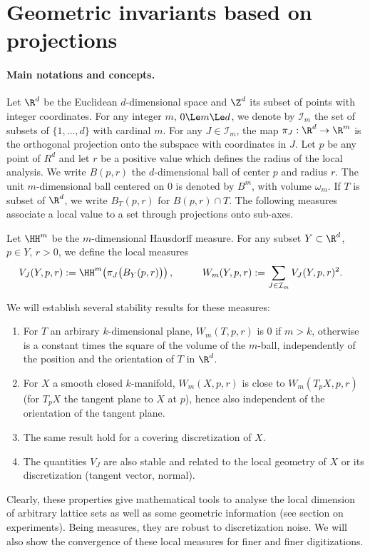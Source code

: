 \section{Geometric invariants based on projections}


\paragraph*{Main notations and concepts.}
Let $\R^d$ be the Euclidean $d$-dimensional space and $\Z^d$ its
subset of points with integer coordinates. For any integer $m$, $0 \Le
m \Le d$, we denote by $\mathcal{I}_m$ the set of subsets of
$\{1,\dots,d\}$ with cardinal $m$. For any $J \in \mathcal{I}_m$, the
map $\pi_J: \R^d \to \R^m$ is the orthogonal projection onto the
subspace with coordinates in $J$. Let $p$ be any point of $R^d$ and
let $r$ be a positive value which defines the radius of the local
analysis. We write $B(p,r)$ the $d$-dimensional ball of center $p$ and
radius $r$. The unit $m$-dimensional ball centered on $0$ is denoted
by $B^m$, with volume $\omega_m$. If $T$ is subset of $\R^d$, we write
$B_T(p,r)$ for $B(p,r) \cap T$. The following measures associate a
local value to a set through projections onto sub-axes.

\begin{definition}
  \label{def-local-measures}
  Let $\HH^m$ be the $m$-dimensional
  Hausdorff measure. For any subset $Y \subset \R^d$, $p \in Y$, $r>0$, we define the local measures
  \begin{align}
    V_J(Y,p,r) &:= \HH^m\!\left( \pi_J\bigl(B_Y(p,r)\bigr) \right),
    \quad
    && & W_m(Y,p,r) & := \sum_{J \in \mathcal{I}_m} V_J(Y,p,r)^2.
  \end{align}
\end{definition}

We will establish several stability results for these measures:
\begin{enumerate}
\item For $T$ an arbirary $k$-dimensional plane, $W_m(T,p,r)$ is $0$ if
  $m>k$, otherwise is a constant times the square of the volume of the
  $m$-ball, independently of the position and the orientation of $T$ in $\R^d$.
\item For $X$ a smooth closed $k$-manifold, $W_m(X,p,r)$ is close to
  $W_m(T_p X,p,r)$ (for $T_p X$ the tangent plane to $X$ at $p$),
  hence also independent of the orientation of the tangent plane.
\item The same result hold for a covering discretization of $X$.
\item The quantities $V_J$ are also stable and related to the local
  geometry of $X$ or its discretization (tangent vector, normal).
\end{enumerate}
Clearly, these properties give mathematical tools to analyse the local
dimension of arbitrary lattice sets as well as some geometric
information (see section on experiments). Being measures, they are
robust to discretization noise. We will also show the convergence of
these local measures for finer and finer digitizations.

